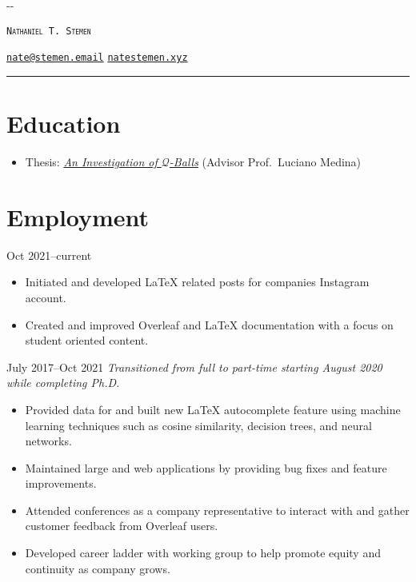 \documentclass{cultvoucher}
\begin{document}
\thispagestyle{firststyle}

\begin{adjustwidth}{\dimexpr-\marginparsep-\marginparwidth}{}
	\begin{center}
		{\Huge \textsc{\texttt{Nathaniel T. Stemen}}\par}
		\href{mailto:nate@stemen.email}{\texttt{nate@stemen.email}} \textbullet{}
		\href{https://natestemen.xyz}{\texttt{natestemen.xyz}}
		\rule{\dimexpr\textwidth+\marginparsep+\marginparwidth}{0.4pt}\par
	\end{center}
\end{adjustwidth}

\section{Education}

\begin{itemize}
	\vspace{-0.25em}
	\item Thesis: \href{https://natestemen.xyz/qv-thesis.pdf}{\textit{An Investigation of $\mathcal{Q}$-Balls}} (Advisor Prof.\ Luciano Medina)
\end{itemize}

\section{Employment}
{Oct 2021--current}
\begin{itemize}
	\vspace{-0.25em}
	\item Initiated and developed \LaTeX{} related posts for companies Instagram account.
	\item Created and improved Overleaf and \LaTeX{} documentation with a focus on student oriented content.
\end{itemize}
{July 2017--Oct 2021}
\vspace{-0.25em}
\emph{Transitioned from full to part-time starting August 2020 while completing Ph.D.}
\begin{itemize}
	\vspace{-0.25em}
	\item Provided data for and built new \LaTeX{} autocomplete feature using machine learning techniques such as cosine similarity, decision trees, and neural networks.
	\item Maintained large  and  web applications by providing bug fixes and feature improvements.
	\item Attended conferences as a company representative to interact with and gather customer feedback from Overleaf users.
	\item Developed career ladder with working group to help promote equity and continuity as company grows.
\end{itemize}
\end{document}

